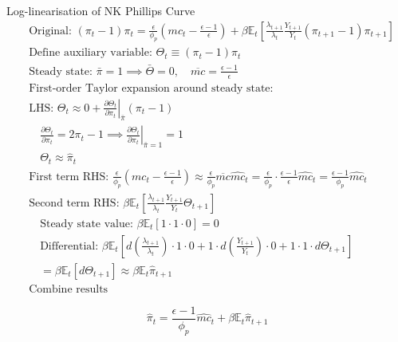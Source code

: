 \documentclass[11pt,preprint]{elsarticle}
\numberwithin{equation}{section}
\numberwithin{figure}{section}
\numberwithin{table}{section}
\begin{document}
Log-linearisation of NK Phillips Curve \begin{align*}
& \text{Original: } (\pi_t - 1)\pi_t = \frac{\epsilon}{\phi_p} \left( mc_t - \frac{\epsilon-1}{\epsilon} \right) + \beta \mathbb{E}_t \left[ \frac{\lambda_{t+1}}{\lambda_t} \frac{Y_{t+1}}{Y_t} (\pi_{t+1} - 1)\pi_{t+1} \right] \\[6pt]
& \text{Define auxiliary variable: } \Theta_t \equiv (\pi_t - 1)\pi_t \\[6pt]
& \text{Steady state: } \bar{\pi} = 1 \implies \bar{\Theta} = 0, \quad \overline{mc} = \frac{\epsilon-1}{\epsilon} \\[6pt]
& \text{First-order Taylor expansion around steady state:} \\[6pt]
& \text{LHS: } \Theta_t \approx 0 + \left.\frac{\partial \Theta_t}{\partial \pi_t}\right|_{\bar{\pi}} (\pi_t - 1) \\
& \quad \frac{\partial \Theta_t}{\partial \pi_t} = 2\pi_t - 1 \implies \left.\frac{\partial \Theta_t}{\partial \pi_t}\right|_{\bar{\pi}=1} = 1 \\
& \quad \Theta_t \approx \hat{\pi}_t \\[6pt]
& \text{First term RHS: } \frac{\epsilon}{\phi_p} \left( mc_t - \frac{\epsilon-1}{\epsilon} \right) \approx \frac{\epsilon}{\phi_p} \overline{mc} \widehat{mc}_t = \frac{\epsilon}{\phi_p} \cdot \frac{\epsilon-1}{\epsilon} \widehat{mc}_t = \frac{\epsilon-1}{\phi_p} \widehat{mc}_t \\[6pt]
& \text{Second term RHS: } \beta \mathbb{E}_t \left[ \frac{\lambda_{t+1}}{\lambda_t} \frac{Y_{t+1}}{Y_t} \Theta_{t+1} \right] \\[6pt]
& \quad \text{Steady state value: } \beta \mathbb{E}_t \left[ 1 \cdot 1 \cdot 0 \right] = 0 \\[6pt]
& \quad \text{Differential: } \beta \mathbb{E}_t \left[ d\left( \frac{\lambda_{t+1}}{\lambda_t} \right) \cdot 1 \cdot 0 + 1 \cdot d\left( \frac{Y_{t+1}}{Y_t} \right) \cdot 0 + 1 \cdot 1 \cdot d\Theta_{t+1} \right] \\
& \quad = \beta \mathbb{E}_t \left[ d\Theta_{t+1} \right] \approx \beta \mathbb{E}_t \hat{\pi}_{t+1} \\[6pt]
& \text{Combine results}
\end{align*}

\begin{equation}\label{nkpc_linearised_app}
\boxed{\hat{\pi}_t = \frac{\epsilon-1}{\phi_p} \widehat{mc}_t + \beta \mathbb{E}_t \hat{\pi}_{t+1}}
\end{equation}
\end{document}
